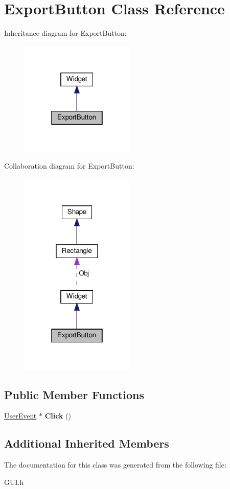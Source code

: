 \hypertarget{classExportButton}{}\section{Export\+Button Class Reference}
\label{classExportButton}


Inheritance diagram for Export\+Button\+:\nopagebreak
\begin{figure}[H]
\begin{center}
\leavevmode
\includegraphics[width=154pt]{classExportButton__inherit__graph}
\end{center}
\end{figure}


Collaboration diagram for Export\+Button\+:\nopagebreak
\begin{figure}[H]
\begin{center}
\leavevmode
\includegraphics[width=154pt]{classExportButton__coll__graph}
\end{center}
\end{figure}
\subsection*{Public Member Functions}
\begin{DoxyCompactItemize}
\item 
\mbox{\label{classExportButton_a76d9c475723745c54a83a1a896bdd900}} 
\hyperlink{classUserEvent}{User\+Event} $\ast$ {\bfseries Click} ()
\end{DoxyCompactItemize}
\subsection*{Additional Inherited Members}


The documentation for this class was generated from the following file\+:\begin{DoxyCompactItemize}
\item 
G\+U\+I.\+h\end{DoxyCompactItemize}
